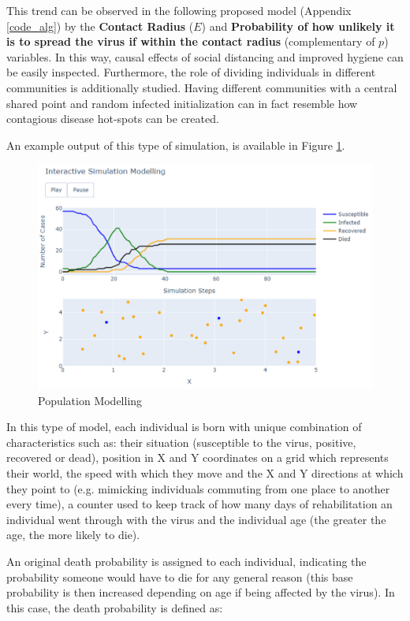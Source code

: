 This trend can be observed in the following proposed model (Appendix \ref{code_alg}) by the \textbf{Contact Radius} ($E$) and \textbf{Probability of how unlikely it is to spread the virus if within the contact radius} (complementary of $p$) variables.
In this way, causal effects of social distancing and improved hygiene can be easily inspected. Furthermore, the role of dividing individuals in different communities is additionally studied. Having different communities with a central shared point and random infected initialization can in fact resemble how contagious disease hot-spots can be created.

An example output of this type of simulation, is available in Figure \ref{pop}.

\begin{figure}[ht!]%
    \centering
    \includegraphics[width=0.85\linewidth]{latex/images/pop.pdf}
    \caption{Population Modelling}
    \label{pop}
\end{figure}

In this type of model, each individual is born with unique combination of characteristics such as: their situation (susceptible to the virus, positive, recovered or dead), position in X and Y coordinates on a grid which represents their world, the speed with which they move and the X and Y directions at which they point to (e.g. mimicking individuals commuting from one place to another every time), a counter used to keep track of how many days of rehabilitation an individual went through with the virus and the individual age (the greater the age, the more likely to die). 

An original death probability is assigned to each individual, indicating the probability someone would have to die for any general reason (this base probability is then increased depending on age if being affected by the virus). In this case, the death probability is defined as:


